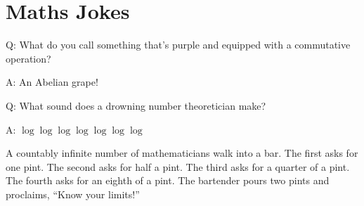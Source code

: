 \section{Maths Jokes}

Q: What do you call something that's purple and equipped with a commutative
operation?

A: An Abelian grape!

Q: What sound does a drowning number theoretician make?

A: \(\log \log \log \log \log \log \log\)

A countably infinite number of mathematicians walk into a bar.
{The first asks for one pint.
\footnotesize The second asks for half a pint.
\scriptsize The third asks for a quarter of a pint.
\tiny The fourth asks for an eighth of a pint}.
The bartender pours two pints and proclaims, ``Know your limits!''
